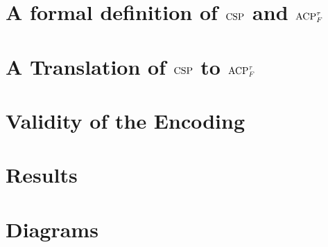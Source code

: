 \documentclass[logo,bsc,singlespacing,parskip,online]{infthesis}
\begin{document}
\chapter{A formal definition of \texorpdfstring{$\mathrm{CSP}$}{CSP} and \texorpdfstring{$\mathrm{ACP}_{F}^{\tau}$}{ACP}}


\chapter{A Translation of \texorpdfstring{$\mathrm{CSP}$}{CSP} to \texorpdfstring{$\mathrm{ACP}_{F}^{\tau}$}{ACP}}



\newpage
\chapter{Validity of the Encoding}


\chapter{Results}

%
% 






\appendix

\chapter{Diagrams}
\end{document}
